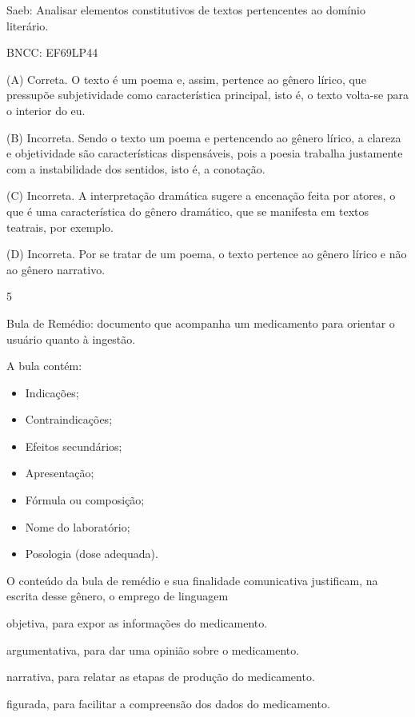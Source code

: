 Saeb: Analisar elementos constitutivos de textos pertencentes ao domínio
literário.

BNCC: EF69LP44

(A) Correta. O texto é um poema e, assim, pertence ao gênero lírico, que
pressupõe subjetividade como característica principal, isto é, o texto
volta-se para o interior do eu.

(B) Incorreta. Sendo o texto um poema e pertencendo ao gênero lírico, a
clareza e objetividade são características dispensáveis, pois a poesia
trabalha justamente com a instabilidade dos sentidos, isto é, a
conotação.

(C) Incorreta. A interpretação dramática sugere a encenação feita por
atores, o que é uma característica do gênero dramático, que se manifesta
em textos teatrais, por exemplo.

(D) Incorreta. Por se tratar de um poema, o texto pertence ao gênero
lírico e não ao gênero narrativo.

\num{5}

Bula de Remédio: documento que acompanha um medicamento para orientar o
usuário quanto à ingestão.

A bula contém:

\begin{itemize}
\item
  Indicações;
\item
  Contraindicações;
\item
  Efeitos secundários;
\item
  Apresentação;
\item
  Fórmula ou composição;
\item
  Nome do laboratório;
\item
  Posologia (dose adequada).
\end{itemize}


O conteúdo da bula de remédio e sua finalidade comunicativa justificam,
na escrita desse gênero, o emprego de linguagem

\begin{escolha}
\item objetiva, para expor as informações do medicamento.

\item argumentativa, para dar uma opinião sobre o medicamento.

\item narrativa, para relatar as etapas de produção do medicamento.

\item figurada, para facilitar a compreensão dos dados do medicamento.
\end{escolha}

